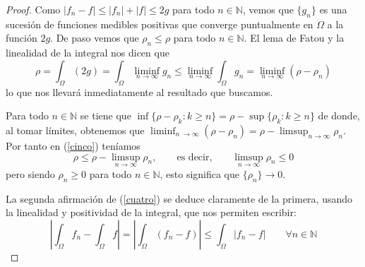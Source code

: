 \documentclass[a4paper, 12pt]{article}
\begin{document}
\begin{enumerate}[label=\textbf{\arabic*}.]
\begin{proof}
Como \(|f_n - f| \leq |f_n| + |f| \leq 2g\) para todo \(n \in \mathbb{N}\), vemos que \(\{g_n\}\) es una sucesión de funciones medibles positivas que converge puntualmente en \(\Omega\) a la función \(2g\). De paso vemos que \(\rho_n \leq \rho\) para todo \(n \in \mathbb{N}\). El lema de Fatou y la linealidad de la integral nos dicen que
\begin{equation}\label{cinco}
\rho = \int_{\Omega} (2g) = \int_{\Omega} \liminf_{n \to \infty} g_n \leq \liminf_{n \to \infty} \int_{\Omega} g_n = \liminf_{n \to \infty} (\rho - \rho_n)
\end{equation}
lo que nos llevará inmediatamente al resultado que buscamos.

Para todo \(n \in \mathbb{N}\) se tiene que \(\inf \{\rho - \rho_k: k \geq n\} = \rho - \sup \{\rho_k : k \geq n\}\) de donde, al tomar límites, obtenemos que \(\liminf_{n\ \to \infty} (\rho - \rho_n) = \rho - \limsup_{n \to \infty} \rho_n\). Por tanto en (\ref{cinco}) teníamos
\[
	\rho \leq \rho - \limsup_{n \to \infty} \rho_n, \qquad \text{es decir,} \qquad \limsup_{n \to \infty} \rho_n \leq 0
\]
pero siendo \(\rho_n \geq 0\) para todo \(n \in \mathbb{N}\), esto significa que \(\{\rho_n\} \to 0\).

La segunda afirmación de (\ref{cuatro}) se deduce claramente de la primera, usando la linealidad y positividad de la integral, que nos permiten escribir:
\[
	\left| \int_{\Omega} f_n - \int_{\Omega} f \right| = \left| \int_{\Omega} (f_n - f) \right| \leq \int_{\Omega} |f_n - f| \qquad \forall n \in \mathbb{N}
\]
\end{proof}
\end{enumerate}
\end{document}
